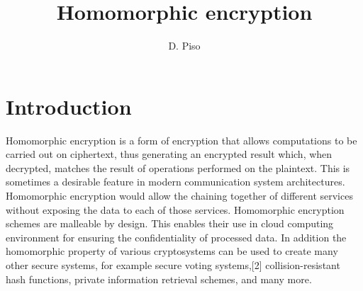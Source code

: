 \documentclass[12pt, letterpaper]{report}
\author{D. Piso}
\title{Homomorphic encryption}
\begin{document}
\maketitle
\newpage
\setcounter{page}{1}

\newpage

\newpage
\tableofcontents
\newpage
\listoffigures
{}
\newpage
\setcounter{page}{1}

\section*{Introduction}
Homomorphic encryption is a form of encryption that allows computations to be carried out on ciphertext, thus generating an encrypted result which, when decrypted, matches the result of operations performed on the plaintext.
This is sometimes a desirable feature in modern communication system architectures. Homomorphic encryption would allow the chaining together of different services without exposing the data to each of those services. Homomorphic encryption schemes are malleable by design. This enables their use in cloud computing environment for ensuring the confidentiality of processed data. In addition the homomorphic property of various cryptosystems can be used to create many other secure systems, for example secure voting systems,[2] collision-resistant hash functions, private information retrieval schemes, and many more.
\nocite{*}
\printbibliography
{}
\end{document}

